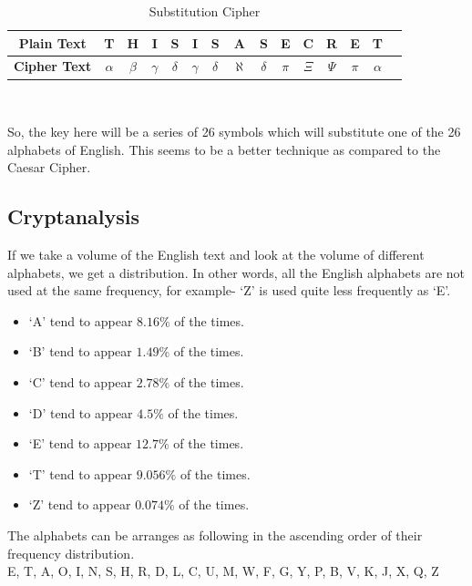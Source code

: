 \documentclass{llncs}
\begin{document}
\begin{table}[h]
\begin{center}
\begin{tabular}{ |c|c|c|c|c|c|c|c|c|c|c|c|c|c|c| }
\hline
\textbf{Plain Text} & T & H & I & S & I & S & A & S & E & C & R & E & T \\
\hline
\textbf{Cipher Text} & $\alpha$ & $\beta$ & $\gamma$ & $\delta$ & $\gamma$ & $\delta$ & $\aleph$ & $\delta$ & $\pi$ & $\Xi$ & $\Psi$ & $\pi$ & $\alpha$ \\
\hline
\end{tabular}\\
\vspace{2mm}
\caption{Substitution Cipher}
\label{sub}
\end{center}
\end{table}

So, the key here will be a series of 26 symbols which will substitute one of the 26 alphabets of English. This seems to be a better technique as compared to the Caesar Cipher. 

\subsection{Cryptanalysis}
If we take a volume of the English text and look at the volume of different alphabets, we get a distribution. In other words, all the English alphabets are not used at the same frequency, for example- `Z' is used quite less frequently as `E'. 
\begin{itemize}
\item `A' tend to appear $8.16 \%$ of the times. 
\item `B' tend to appear $1.49 \%$ of the times. 
\item `C' tend to appear $2.78 \%$ of the times. 
\item `D' tend to appear $4.5 \%$ of the times. 
\item `E' tend to appear $12.7 \%$ of the times. 
\item `T' tend to appear $9.056 \%$ of the times. 
\item `Z' tend to appear $0.074 \%$ of the times. 
\end{itemize}

The alphabets can be arranges as following in the ascending order of their frequency distribution. \\
E, T, A, O, I, N, S, H, R, D, L, C, U, M, W, F, G, Y, P, B, V, K, J, X, Q, Z\\
\end{document}
